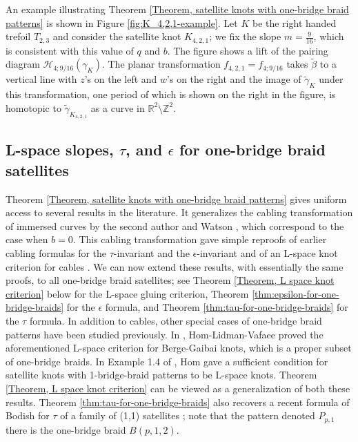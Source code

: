 \documentclass{amsart}
\newcommand{\Z}{\mathbb{Z}}
\newcommand{\R}{\mathbb{R}}
\theoremstyle{definition}
\theoremstyle{remark}
\numberwithin{equation}{section}
\numberwithin{equation}{section} \makeatletter
\begin{document}
An example illustrating Theorem \ref{Theorem, satellite knots with one-bridge braid patterns} is shown in Figure \ref{fig:K_4,2,1-example}. Let $K$ be the right handed trefoil $T_{2,3}$ and consider the satellite knot $K_{4,2,1}$; we fix the slope $m = \frac{9}{16}$, which is consistent with this value of $q$ and $b$. The figure shows a lift of the pairing diagram $\mathcal{H}_{4;9/16}(\gamma_K)$. The planar transformation $f_{4,2,1} = f_{4;9/16}$ takes $\tilde \beta$ to a vertical line with $z$'s on the left and $w$'s on the right and the image of $\tilde\gamma_K$ under this transformation, one period of which is shown on the right in the figure, is homotopic to $\tilde\gamma_{K_{4,2,1}}$ as a curve in $\R^2 \setminus \Z^2$.

\subsection{L-space slopes, $\tau$, and $\epsilon$ for one-bridge braid satellites}\label{sec:one-bridge-tau}

Theorem \ref{Theorem, satellite knots with one-bridge braid patterns} gives uniform access to several results in the literature. It generalizes the cabling transformation of immersed curves by the second author and Watson \cite{Hanselman2023}, which correspond to the case when $b=0$. This cabling transformation gave simple reproofs of earlier cabling formulas for the $\tau$-invariant and the $\epsilon$-invariant \cite[Theorems 1 and 2]{MR3217622} and of an L-space knot criterion for cables \cite{Hom2011}. We can now extend these results, with essentially the same proofs, to all one-bridge braid satellites; see Theorem \ref{Theorem, L space knot criterion} below for the L-space gluing criterion, Theorem \ref{thm:epsilon-for-one-bridge-braids} for the $\epsilon$ formula, and Theorem \ref{thm:tau-for-one-bridge-braids} for the $\tau$ formula. In addition to cables, other special cases of one-bridge braid patterns have been studied previously. In \cite{HLV2014}, Hom-Lidman-Vafaee proved the aforementioned L-space criterion for Berge-Gaibai knots, which is a proper subset of one-bridge braids. In Example 1.4 of \cite{Hom2016}, Hom gave a sufficient condition for satellite knots with 1-bridge-braid patterns to be L-space knots. Theorem \ref{Theorem, L space knot criterion} can be viewed as a generalization of both these results. Theorem \ref{thm:tau-for-one-bridge-braids} also recovers a recent formula of Bodish for $\tau$ of a family of (1,1) satellites \cite[Theorem 1.1]{Bodish}; note that the pattern denoted $P_{p,1}$ there is the one-bridge braid $B(p,1,2)$.
\end{document}
